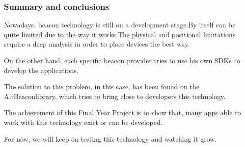 \begin{frame} [fragile]
	\frametitle{Summary and conclusions}
		Nowadays, beacon technology is still on a development stage.By itself can be quite limited due to the way it works.The physical and positional limitations require a deep analysis in order to place devices the best way.
		
		\bigskip
		On the other hand, each specific beacon provider tries to use his own SDKs to develop the applications.
		
		\bigskip
		The solution to this problem, in this case, has been found on the AltBeaconlibrary, which tries to bring close to developers this technology.
		
		\bigskip
	The achievement of this Final Year Project is to show that, many apps able to work with this technology exist or can be developed.
	
		\bigskip
		For now, we will keep on testing this technology and watching it grow.

	\endblock{}
\end{frame}